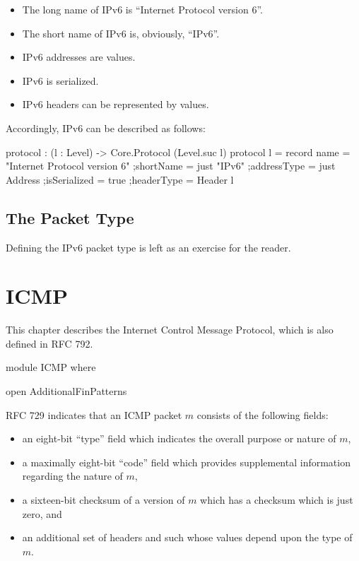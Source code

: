 \documentclass{report}
\begin{document}
\begin{itemize}
\begin{itemize}
  \item The long name of IPv6 is ``Internet Protocol version 6''.
  \item The short name of IPv6 is, obviously, ``IPv6''.
  \item IPv6 addresses are  values.
  \item IPv6 is serialized.
  \item IPv6 headers can be represented by  values.
\end{itemize}

Accordingly, IPv6 can be described as follows:

\begin{code}
  protocol : (l : Level) -> Core.Protocol (Level.suc l)
  protocol l = record
    {name = "Internet Protocol version 6"
    ;shortName = just "IPv6"
    ;addressType = just Address
    ;isSerialized = true
    ;headerType = Header l
    }
\end{code}

\section{The Packet Type}
Defining the IPv6 packet type is left as an exercise for the reader.

\chapter{ICMP}
This chapter describes the Internet Control Message Protocol, which is also defined in RFC 792.

\begin{code}
module ICMP where

  open AdditionalFinPatterns
\end{code}

RFC 729 indicates that an ICMP packet \(m\) consists of the following fields:

\begin{itemize}
  \item an eight-bit ``type'' field which indicates the overall purpose or nature of \(m\),
  \item a maximally eight-bit ``code'' field which provides supplemental information regarding the nature of \(m\),
  \item a sixteen-bit checksum of a version of \(m\) which has a checksum which is just zero, and
  \item an additional set of headers and such whose values depend upon the type of \(m\).
\end{itemize}


\end{itemize}
\end{document}
